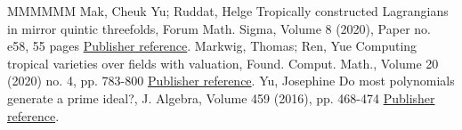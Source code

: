 \documentclass[11pt]{article}
\theoremstyle{definition}
\numberwithin{equation}{section}
\begin{document}
\begin{thebibliography}{MMMMMM}
 Mak, Cheuk Yu; Ruddat, Helge Tropically constructed Lagrangians in mirror quintic threefolds, Forum Math. Sigma, Volume 8 (2020), Paper no. e58, 55 pages \href{https://alco.centre-mersenne.org/articles/10.5802/alco.327/#MakRuddat20}{Publisher reference}.
 Markwig, Thomas; Ren, Yue Computing tropical varieties over fields with valuation, Found. Comput. Math., Volume 20 (2020) no. 4, pp. 783-800 \href{https://alco.centre-mersenne.org/articles/10.5802/alco.327/#MR20}{Publisher reference}.
 Yu, Josephine Do most polynomials generate a prime ideal?, J. Algebra, Volume 459 (2016), pp. 468-474 \href{https://alco.centre-mersenne.org/articles/10.5802/alco.327/#Yu16}{Publisher reference}.
\end{thebibliography}
\end{document}

